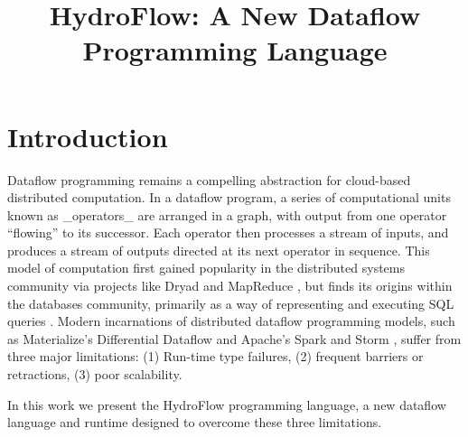 

\let\Bbbk\relax
\usepackage{amssymb}
\usepackage[checkNoComments]{hydrocomments}
\usepackage{utf8math,ttquot,mathpartir,amsmath, mathtools,multicol,xspace,stmaryrd }




\title{HydroFlow: A New Dataflow Programming Language}




\begin{abstract}


\end{abstract}

\maketitle

\section{Introduction}


Dataflow programming remains a compelling abstraction for cloud-based distributed computation.  In a dataflow program, a series of computational units known as _operators_ are arranged in a graph, with output from one operator ``flowing'' to its successor.  Each operator then processes a stream of inputs, and produces a stream of outputs directed at its next operator in sequence. This model of computation first gained popularity in the distributed systems community via projects like Dryad \cite{dryad} and MapReduce \cite{mapreduce}, but finds its origins within the databases community, primarily as a way of representing and executing SQL queries \cite{sql-dataflow}. Modern incarnations of distributed dataflow programming models, such as Materialize's Differential Dataflow and Apache's Spark and Storm \cite{spark, storm}, suffer from three major limitations: (1) Run-time type failures, (2) frequent barriers or retractions, (3) poor scalability. 


In this work we present the HydroFlow programming language, a new dataflow language and runtime designed to overcome these three limitations.  

